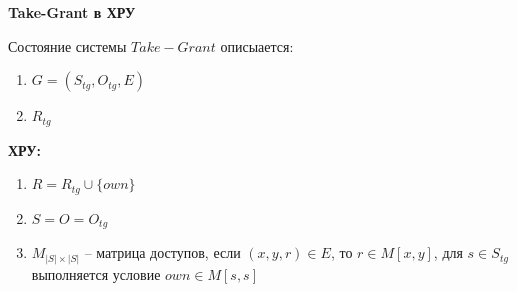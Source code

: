 \textbf{Take-Grant в ХРУ}

Состояние системы $Take-Grant$ описыается:
\begin{enumerate}
	\item $G=(S_{tg}, O_{tg}, E)$
	\item $R_{tg}$
\end{enumerate}

\textbf{ХРУ:}
\begin{enumerate}
	\item $R = R_{tg} \cup \{own\}$
	\item $S = O = O_{tg}$
	\item $M_{|S| \times |S|}$ -- матрица доступов, если $(x,y,r) \in E$, то $r \in M[x,y]$, для $s \in S_{tg}$ выполняется условие $own \in M[s,s]$
\end{enumerate}


